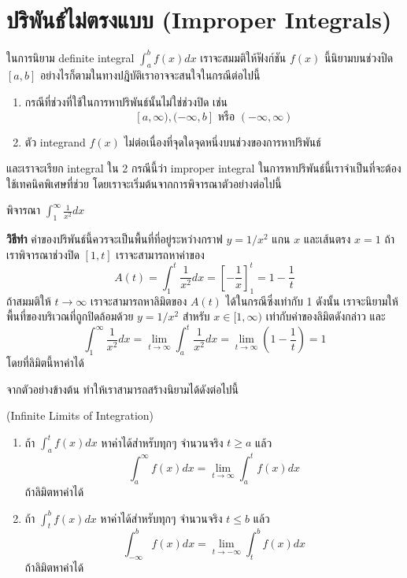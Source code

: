 \documentclass[
]{book}
\begin{document}
\section{ปริพันธ์ไม่ตรงแบบ (Improper
Integrals)}\label{uxe1buxe23uxe1euxe19uxe18uxe44uxe21uxe15uxe23uxe07uxe41uxe1auxe1a-improper-integrals}

ในการนิยาม definite integral \(\int_{a}^{b} f(x) dx\) เราจะสมมติให้ฟังก์ชัน
\(f(x)\) นี้นิยามบนช่วงปิด \([a,b]\)
อย่างไรก็ตามในทางปฎิบัติเราอาจจะสนใจในกรณีต่อไปนี้

\begin{enumerate}
\def\labelenumi{\arabic{enumi}.}
\item
  กรณีที่ช่วงที่ใช้ในการหาปริพันธ์นั้นไม่ใช่ช่วงปิด เช่น
  \[[a, \infty) , (-\infty,b] \text{ หรือ } (-\infty,\infty)\]
\item
  ตัว integrand \(f(x)\) ไม่ต่อเนื่องที่จุดใดจุดหนึ่งบนช่วงของการหาปริพันธ์
\end{enumerate}

และเราจะเรียก integral ใน 2 กรณีนี้ว่า improper integral
ในการหาปริพันธ์นี้เราจำเป็นที่จะต้องใช้เทคนิคพิเศษที่ช่วย
โดยเราจะเริ่มต้นจากการพิจารณาตัวอย่างต่อไปนี้

พิจารณา \(\int_{1}^{\infty} \frac{1}{x^2} dx\)

\textbf{วิธีทำ} ค่าของปริพันธ์นี้ควรจะเป็นพื้นที่ที่อยู่ระหว่างกราฟ \(y =  1/x^2\) แกน
\(x\) และเส้นตรง \(x=1\) ถ้าเราพิจารณาช่วงปิด \([1,t]\) เราจะสามารถหาค่าของ
\[A(t) = \int_{1}^{t} \frac{1}{x^2} dx =  \left[-\frac{1}{x}\right]_{1}^{t} = 1 - \frac{1}{t}\]
ถ้าสมมติให้ \(t \rightarrow \infty\) เราจะสามารถหาลิมิตของ \(A(t)\)
ได้ในกรณีซึ่งเท่ากับ 1 ดังนั้น เราจะนิยามให้พื้นที่ของบริเวณที่ถูกปิดล้อมด้วย \(y =  1/x^2\)
สำหรับ \(x \in [1,\infty)\) เท่ากับค่าของลิมิตดังกล่าว และ
\[\int_{1}^{\infty} \frac{1}{x^2} dx = \lim_{t \rightarrow \infty} \int_{a}^t \frac{1}{x^2}dx = 
    \lim_{t \rightarrow \infty} (1 - \frac{1}{t}) = 1\] โดยที่ลิมิตนี้หาค่าได้

จากตัวอย่างข้างต้น ทำให้เราสามารถสร้างนิยามได้ดังต่อไปนี้

(Infinite Limits of Integration)

\begin{enumerate}
\def\labelenumi{\arabic{enumi}.}
\item
  ถ้า \(\int_{a}^{t}f(x)dx\) หาค่าได้สำหรับทุกๆ จำนวนจริง \(t \ge a\) แล้ว
  \[\int_{a}^{\infty} f(x) dx  = \lim_{t \rightarrow \infty} \int_{a}^t f(x) dx\]
  ถ้าลิมิตหาค่าได้
\item
  ถ้า \(\int_{t}^{b}f(x)dx\) หาค่าได้สำหรับทุกๆ จำนวนจริง \(t \le b\) แล้ว
  \[\int_{-\infty}^{b} f(x) dx  = \lim_{t \rightarrow -\infty} \int_{t}^b f(x) dx\]
  ถ้าลิมิตหาค่าได้
\end{enumerate}
\end{document}
